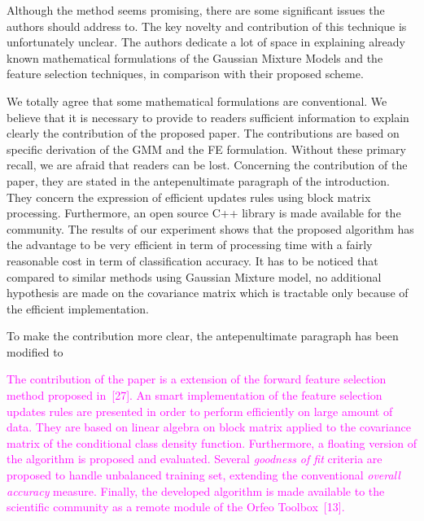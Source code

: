 \documentclass[a4paper,10pt,DIV=16]{scrartcl}
\newcommand{\rev}[1]{\textcolor{magenta}{#1}}
\begin{document}
\begin{revbox}
  Although the method seems promising, there are some significant issues the authors should address to. The key novelty and contribution of this technique is unfortunately unclear. The authors dedicate a lot of space in explaining already known mathematical formulations of the Gaussian Mixture Models and the feature selection techniques, in comparison with their proposed scheme.
  \begin{resbox}
    We totally agree that some mathematical formulations are conventional. We believe that it is necessary to provide to readers sufficient information to explain clearly the contribution of the proposed paper. The contributions are based on specific derivation of the GMM and the FE formulation. Without these primary recall, we are afraid that readers can be lost. Concerning the contribution of the paper, they are stated in the antepenultimate paragraph of the introduction. They concern the expression of efficient updates rules using block matrix processing. Furthermore, an open source C++ library is made available for the community. The results of our experiment shows that the proposed algorithm has the advantage to be very efficient in term of processing time with a fairly reasonable cost in term of classification accuracy. It has to be noticed that compared to similar methods using Gaussian Mixture model, no additional hypothesis are made on the covariance matrix which is tractable only because of the efficient implementation.

    To make the contribution more clear, the antepenultimate paragraph has been modified to

\rev{The contribution of the paper is a extension of the forward feature selection method proposed in~[27]. An smart implementation of the feature selection updates rules are presented in order to perform efficiently on large amount of data. They are based on linear algebra on block matrix applied to the covariance matrix of the conditional class density function.  Furthermore, a floating version of the algorithm is proposed and evaluated. Several \emph{goodness of fit} criteria are proposed to handle unbalanced training set, extending the conventional \emph{overall accuracy} measure.  Finally, the developed algorithm is made available to the scientific community as a remote module of the Orfeo Toolbox~[13].}
  \end{resbox}
\end{revbox}
\end{document}
